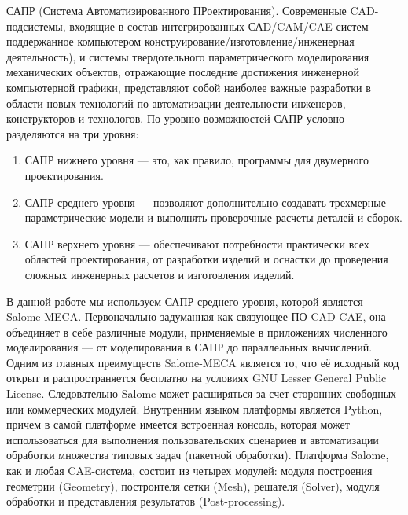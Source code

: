 \documentclass[a4paper,12pt]{article}
\theoremstyle{plain} %
\theoremstyle{definition} %
\theoremstyle{remark} %
\begin{document}
	САПР (Система Автоматизированного ПРоектирования). Современные CAD-подсистемы, входящие в состав интегрированных САD/CAM/CAE-систем — поддержанное компьютером конструирование/изготовление/инженерная деятельность), и системы твердотельного параметрического моделирования механических объектов, отражающие последние достижения	инженерной компьютерной графики, представляют собой наиболее важные разработки в области новых технологий по автоматизации деятельности инженеров,	конструкторов и технологов. По уровню возможностей САПР условно разделяются на три уровня:
	\begin{enumerate}
		\item САПР нижнего уровня — это, как правило, программы для двумерного проектирования.
		\item САПР среднего уровня — позволяют дополнительно создавать трехмерные параметрические модели и выполнять проверочные расчеты деталей и сборок.
		\item САПР верхнего уровня — обеспечивают потребности практически всех областей проектирования, от разработки изделий и оснастки до проведения сложных инженерных расчетов и изготовления изделий\cite{bBolshakov}.
	\end{enumerate}
	В данной работе мы используем САПР среднего уровня, которой является Salome-MECA. Первоначально задуманная как связующее ПО CAD-CAE, она объединяет в себе различные модули, применяемые в приложениях численного моделирования — от моделирования в САПР до параллельных вычислений. Одним из главных преимуществ Salome-MECA является то, что её исходный код открыт и распространяется бесплатно на условиях GNU Lesser General Public License. Следовательно Salome может расширяться за счет сторонних свободных или коммерческих модулей. Внутренним языком платформы является Python, причем в самой платформе имеется встроенная консоль, которая может использоваться для выполнения пользовательских сценариев и автоматизации обработки множества типовых задач (пакетной обработки)\cite{wOfDoc}. Платформа Salome, как и любая CAE-система, состоит из четырех модулей: модуля построения геометрии (Geometry), построителя сетки (Mesh), решателя (Solver), модуля обработки и представления результатов (Post-processing).
			
\end{document}
